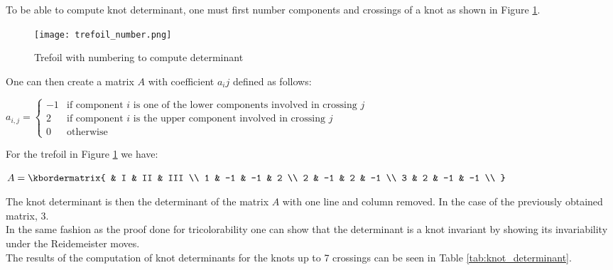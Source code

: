\documentclass[12pt, a4paper]{article}
\begin{document}
To be able to compute knot determinant, one must first number components and crossings of a knot as shown in Figure \ref{fig:trefoil_number}.

\begin{figure}[H]
  \centering
  \texttt{[image: trefoil\_number.png]}
  \caption{Trefoil with numbering to compute determinant}
  \label{fig:trefoil_number}
\end{figure}

One can then create a matrix $A$ with coefficient $a_{i}{j}$ defined as follows:\\

\begin{center}
  $a_{i,j} =
  \begin{cases}
    -1 &\text{if component $i$ is one of the lower components involved in crossing $j$}\\
    2 &\text{if component $i$ is the upper component involved in crossing $j$}\\
    0 &\text{otherwise}
  \end{cases}$
\end{center}

For the trefoil in Figure \ref{fig:trefoil_number} we have:

\begin{center}
$
  A = \kbordermatrix{
    & I & II & III \\
    1 & -1 & -1 & 2  \\
    2 & -1 & 2 & -1  \\
    3 & 2 & -1 & -1  \\
  }
$
\end{center}

The knot determinant is then the determinant of the matrix $A$ with one line and column removed. In the case of the previously obtained matrix, 3.\\

In the same fashion as the proof done for tricolorability one can show that the determinant is a knot invariant by showing its invariability under the Reidemeister moves.\\

The results of the computation of knot determinants for the knots up to 7 crossings can be seen in Table \ref{tab:knot_determinant}.
\end{document}
